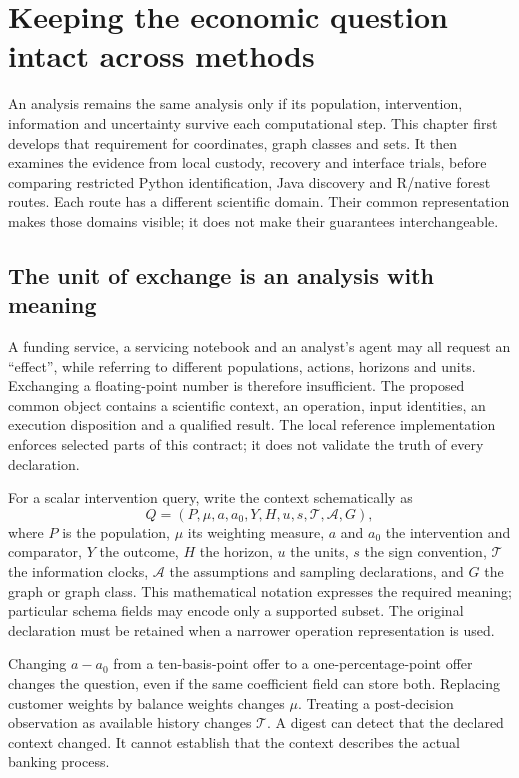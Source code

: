 \chapter{Keeping the economic question intact across methods}
\label{in:semantics}

An analysis remains the same analysis only if its population, intervention, information and uncertainty survive each computational step. This chapter first develops that requirement for coordinates, graph classes and sets. It then examines the evidence from local custody, recovery and interface trials, before comparing restricted Python identification, Java discovery and R/native forest routes. Each route has a different scientific domain. Their common representation makes those domains visible; it does not make their guarantees interchangeable.

\section{The unit of exchange is an analysis with meaning}

A funding service, a servicing notebook and an analyst's agent may all request
an ``effect'', while referring to different populations, actions, horizons and
units. Exchanging a floating-point number is therefore insufficient. The
proposed common object contains a scientific context, an operation, input
identities, an execution disposition and a qualified result. The local
reference implementation enforces selected parts of this contract; it does not
validate the truth of every declaration. \citep{v12_in_contract,v12_in_runtime}

For a scalar intervention query, write the context schematically as
\[
 Q=(P,\mu,a,a_0,Y,H,u,s,\mathcal T,\mathcal A,G),
\]
where $P$ is the population, $\mu$ its weighting measure, $a$ and $a_0$ the
intervention and comparator, $Y$ the outcome, $H$ the horizon, $u$ the units,
$s$ the sign convention, $\mathcal T$ the information clocks, $\mathcal A$ the
assumptions and sampling declarations, and $G$ the graph or graph class.
This mathematical notation expresses the required meaning; particular schema
fields may encode only a supported subset. The original declaration must be
retained when a narrower operation representation is used.

Changing $a-a_0$ from a ten-basis-point offer to a one-percentage-point offer
changes the question, even if the same coefficient field can store both.
Replacing customer weights by balance weights changes $\mu$. Treating a
post-decision observation as available history changes $\mathcal T$. A digest
can detect that the declared context changed. It cannot establish that the
context describes the actual banking process.

